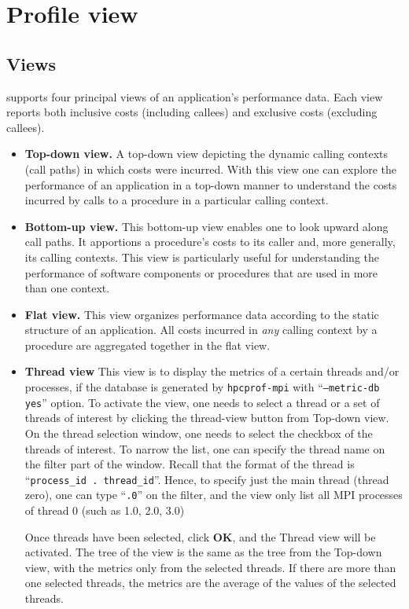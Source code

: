 \documentclass[english]{article}
\begin{document}
\section{Profile view}

\subsection{Views}

 supports four principal views of an application's performance data.
Each view reports both inclusive costs (including callees) and exclusive costs (excluding callees).

\begin{itemize}

\item \textbf{Top-down view.}
A top-down view depicting the dynamic calling contexts (call paths) in which costs were incurred.
With this view one can explore the performance of an application in a top-down manner
to understand the costs incurred by calls to a procedure in a particular calling context.

\item \textbf{Bottom-up view.}
This bottom-up view enables one to look upward along call paths.
It apportions a procedure's costs to its caller and, more generally,
its calling contexts.
This view is particularly useful for understanding the performance of software components or procedures
that are used in more than one context.

\item \textbf{Flat view.}
This view organizes performance data according to the static structure of an application.
All costs incurred in \emph{any} calling context by a procedure are aggregated together in the flat view.

\item \textbf{Thread view}
	This view is to display the metrics of a certain threads and/or processes, if the database is generated by \texttt{hpcprof-mpi} with ``\texttt{--metric-db yes}'' option.
To activate the view, one needs to select a thread or a set of threads of interest by clicking the thread-view button from Top-down view.
On the thread selection window, one needs to select the checkbox of the threads of interest. 
To  narrow the list, one can specify the thread name on the filter part of the window.
Recall that the format of the thread is ``\texttt{process\_id . thread\_id}''.
Hence, to specify just the main thread (thread zero), one can type ``\texttt{.0}'' on the filter, and the view only list all MPI processes of thread 0 (such as 1.0, 2.0, 3.0)

Once threads have been selected, click \textbf{OK}, and the Thread view will be activated. 
The tree of the view is the same as the tree from the Top-down view, with the metrics only from the selected threads.
If there are more than one selected threads, the metrics are the average of the values of the selected threads.


\end{itemize}
\end{document}
